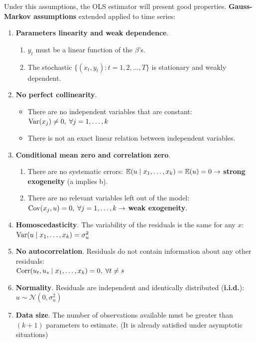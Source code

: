  \begin{f}

Under this assumptions, the OLS estimator will present good properties. \textbf{Gauss-Markov assumptions} extended applied to time series:

\begin{enumerate}[leftmargin=*, label=t\arabic{*}.]
	\item \textbf{Parameters linearity and weak dependence}.
	
	\begin{enumerate}[leftmargin=*, label=\alph{*}.]
		\item \(y_{t}\) must be a linear function of the \(\beta\)'s.
		\item The stochastic \(\lbrace( x_{t}, y_{t}): t = 1, 2, \ldots, T \rbrace\) is stationary and weakly dependent.
	\end{enumerate}
	
	\item \textbf{No perfect collinearity}.
	
	\begin{itemize}[leftmargin=*]
		\item There are no independent variables that are constant: \(\mathrm{Var}(x_{j}) \neq 0, \; \forall j = 1, \ldots, k\)
		\item There is not an exact linear relation between independent variables.
	\end{itemize}
	
	\item \textbf{Conditional mean zero and correlation zero}.
	
	\begin{enumerate}[leftmargin=*, label=\alph{*}.]
		\item There are no systematic errors: \(\mathbb{E}(u \mid x_{1}, \ldots, x_{k}) = \mathbb{E}(u) = 0 \rightarrow\) \textbf{strong exogeneity} (a implies b).
		\item There are no relevant variables left out of the model: \(\mathrm{Cov}(x_{j} , u) = 0, \; \forall j = 1, \ldots, k \rightarrow\) \textbf{weak exogeneity}.
	\end{enumerate}
	
	\item \textbf{Homoscedasticity}. The variability of the residuals is the same for any \(x\): \(\mathrm{Var}(u \mid x_{1}, \ldots, x_{k}) = \sigma^{2}_{u}\)
	\item \textbf{No autocorrelation}. Residuals do not contain information about any other residuals: \\
	\(\mathrm{Corr}(u_{t}, u_{s} \mid x_{1}, \ldots, x_{k}) = 0, \; \forall t \neq s\)
	\item \textbf{Normality}. Residuals are independent and identically distributed (\textbf{i.i.d.}): \(u \sim \mathcal{N}(0, \sigma^{2}_{u})\)
	\item \textbf{Data size}. The number of observations available must be greater than \((k + 1)\) parameters to estimate. (It is already satisfied under asymptotic situations)
\end{enumerate}

\end{f}    

